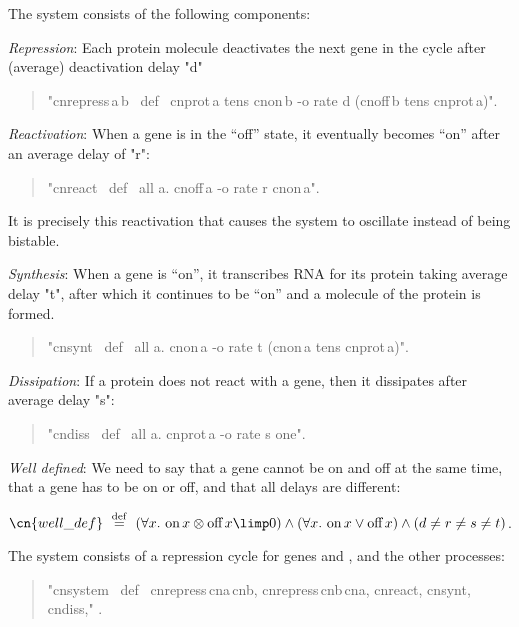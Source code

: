 \documentclass{article}
\def\eqdef{\overset{\mathrm{def}}{=}}
\begin{document}
The system consists of the following components:
\begin{icom}
\item \emph{Repression}: Each protein molecule deactivates the next gene in
  the cycle after (average) deactivation delay "d"
  \begin{quote}
    "cn{repress}\,a\,b \ def \ cn{prot}\,a tens cn{on}\,b -o rate d (cn{off}\,b tens cn{prot}\,a)".
  \end{quote}

\item \emph{Reactivation}: When a gene is in the ``off'' state, it eventually
  becomes ``on'' after an average delay of "r":
  \begin{quote}
    "cn{react} \ def \ all a. cn{off}\,a -o rate r cn{on}\,a".
  \end{quote}
  It is precisely this reactivation that causes the system to oscillate instead
  of being bistable.

\item \emph{Synthesis}: When a gene is ``on'', it transcribes RNA for its
  protein taking average delay "t", after which it continues to be ``on'' and a
  molecule of the protein is formed.
  \begin{quote}
    "cn{synt} \ def \ all a. cn{on}\,a -o rate t (cn{on}\,a tens cn{prot}\,a)".
  \end{quote}

\item \emph{Dissipation}: If a protein does not react with a gene, then it
  dissipates after average delay "s":
  \begin{quote}
    "cn{diss} \ def \ all a. cn{prot}\,a -o rate s one".
  \end{quote}

\item \emph{Well defined}: We need to say that a gene cannot be \textrm{on} and 
     \textrm{off} at the same time, that a gene has to be \textrm{on} or \textrm{off}, 
     and that all delays are different:

  \qquad $\cn{well\_def}~ \eqdef~ 
           (\forall x.~ \textrm{on} \, x \otimes \textrm{off} \, x \limp 0 ) \land
           (\forall x.~ \textrm{on} \, x \lor \textrm{off} \, x) \land
           (d \neq r \neq s \neq t) $.
\end{icom}

\noindent
The system consists of a repression cycle for genes  and , and the other processes:
\begin{quote}
  "cn{system} \ def \ cn{repress}\,cn{a}\,cn{b}, cn{repress}\,cn{b}\,cn{a}, cn{react}, cn{synt}, cn{diss}," .
\end{quote}
\end{document}
